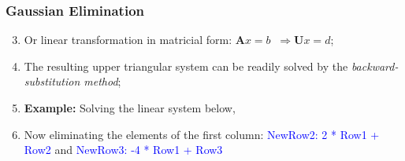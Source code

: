 \documentclass[10pt,compress]{beamer}
\begin{document}
\begin{frame}
  \frametitle{Gaussian Elimination} 
  \begin{enumerate}
  \setcounter{enumi}{2}
     \item <1-> Or linear transformation in matricial form: $\bm{A}x=b\;\;\Longrightarrow \bm{U}x=d$;
     \item <2-> The resulting upper triangular system can be readily solved by the {\it backward-substitution method};
     \item <3-> {\bf Example:} Solving the linear system below,

     \item <4-> Now eliminating the elements of the first column: \textcolor{blue}{NewRow2: 2 * Row1 + Row2} and \textcolor{blue}{NewRow3: -4 * Row1 + Row3} 

  \end{enumerate}
\end{frame}
\end{document}
